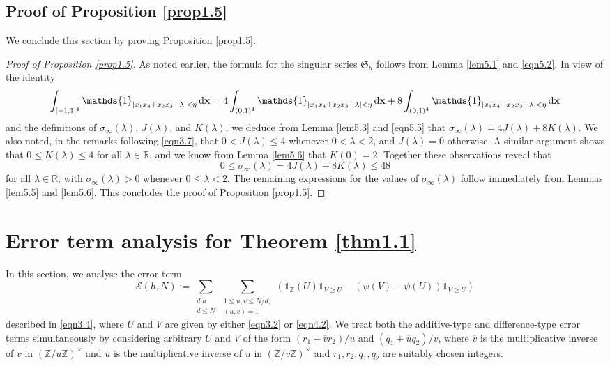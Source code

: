 \documentclass[12pt,reqno]{amsart}
\theoremstyle{definition}
\theoremstyle{remark}
\numberwithin{equation}{section}
\renewcommand{\geq}{\geqslant}
\renewcommand{\leq}{\leqslant}
\def \cE {\mathcal E}
\def \fS {\mathfrak S}
\def \R {\mathbb{R}}
\def\d{{\,{\rm d}}}
\newcommand\1{\mathds{1}}
\begin{document}
\subsection{Proof of Proposition \ref{prop1.5}}

We conclude this section by proving Proposition \ref{prop1.5}. 

\begin{proof}[Proof of Proposition \ref{prop1.5}]
As noted earlier, the formula for the singular series $\fS_h$ follows from Lemma \ref{lem5.1} and \eqref{eqn5.2}. 
In view of the identity
\begin{equation*}
    \int_{[-1,1]^4} \1_{|x_1x_4+ x_2x_3 - \lambda| < \eta} \d \mathbf{x} = 4\int_{(0,1)^4} \1_{|x_1x_4+ x_2x_3 - \lambda| < \eta} \d \mathbf{x} + 8\int_{(0,1)^4} \1_{|x_1x_4- x_2x_3 - \lambda| < \eta} \d \mathbf{x}
\end{equation*}
and the definitions of $\sigma_\infty(\lambda)$, $J(\lambda)$, and $K(\lambda)$, we deduce from Lemma \ref{lem5.3} and \eqref{eqn5.5} that $\sigma_\infty(\lambda) = 4J(\lambda) + 8K(\lambda)$. We also noted, in the remarks following \eqref{eqn3.7}, that $0<J(\lambda)\leqslant 4$ whenever $0<\lambda<2$, and $J(\lambda) = 0$ otherwise. A similar argument shows that $0\leqslant K(\lambda)\leqslant 4$ for all $\lambda\in\R$, and we know from Lemma \ref{lem5.6} that $K(0)=2$. Together these observations reveal that
\begin{equation*}
    0\leqslant \sigma_\infty(\lambda)=4J(\lambda) + 8K(\lambda)\leqslant 48
\end{equation*}
for all $\lambda\in\R$, with $\sigma_\infty(\lambda)>0$ whenever $0\leqslant\lambda<2$. The remaining expressions for the values of $\sigma_\infty(\lambda)$ follow immediately from Lemmas \ref{lem5.5} and \ref{lem5.6}. This concludes the proof of Proposition \ref{prop1.5}.
\end{proof}

\section{Error term analysis for Theorem \ref{thm1.1}}\label{sec6}

In this section, we analyse the error term 
\begin{equation} \label{eqn6.1}
    \cE(h,N):=\sum_{\substack{d|h \\ d \leqslant N}} \sum_{\substack{1 \leq u,v \leq N/d,\\ (u,v) = 1}}(\1_{\mathbb{Z}}(U)\1_{V \geq U} - ( \psi(V) - \psi(U))\1_{V \geq U}) 
\end{equation} 
described in \eqref{eqn3.4}, where $U$ and $V$ are given by either \eqref{eqn3.2} or \eqref{eqn4.2}. We treat both the additive-type and difference-type error terms simultaneously by considering arbitrary $U$ and $V$ of the form $(r_1 + \overline{v} r_2)/u$ and $(q_1 + \overline{u} q_2)/v$, where $\overline{v}$ is the multiplicative inverse of $v$ in $(\mathbb{Z}/u \mathbb{Z})^{\times}$ and $\overline{u}$ is the multiplicative inverse of $u$ in $(\mathbb{Z}/v \mathbb{Z})^{\times}$ and $r_1, r_2, q_1, q_2$ are suitably chosen integers.
\end{document}
